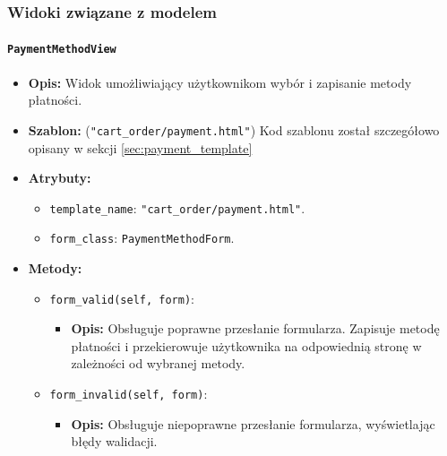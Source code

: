 \documentclass[12pt,a4paper,oneside]{article}
\theoremstyle{definition}
\numberwithin{equation}{section}
\begin{document}
\clearpage
\subsubsection{Widoki związane z modelem}
\paragraph{\texttt{PaymentMethodView}}
\begin{itemize}
    \item \textbf{Opis:} Widok umożliwiający użytkownikom wybór i zapisanie metody płatności.
    \item \textbf{Szablon:}
        (\texttt{"cart\_order/payment.html"})
        \subsubitem Kod szablonu został szczegółowo opisany w sekcji \ref{sec:payment_template}
    \item \textbf{Atrybuty:}
    \begin{itemize}
        \item \texttt{template\_name}: \texttt{"cart\_order/payment.html"}.
        \item \texttt{form\_class}: \texttt{PaymentMethodForm}.
    \end{itemize}
    \item \textbf{Metody:}
    \begin{itemize}
        \item \texttt{form\_valid(self, form)}:
        \begin{itemize}
            \item \textbf{Opis:} Obsługuje poprawne przesłanie formularza. Zapisuje metodę płatności i przekierowuje użytkownika na odpowiednią stronę w zależności od wybranej metody.
        \end{itemize}
        \item \texttt{form\_invalid(self, form)}:
        \begin{itemize}
            \item \textbf{Opis:} Obsługuje niepoprawne przesłanie formularza, wyświetlając błędy walidacji.
        \end{itemize}
    \end{itemize}
\end{itemize}
\end{document}
